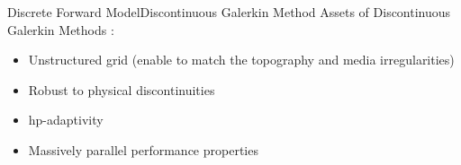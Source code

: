 \begin{frame}{Discrete Forward Model}{Discontinuous Galerkin Method}
  Assets of Discontinuous Galerkin Methods : \\

  \begin{itemize}
  \item Unstructured grid (enable to match the topography and media irregularities)
  \item Robust to physical discontinuities
  \item hp-adaptivity
  \item Massively parallel performance properties
  \end{itemize}

  \begin{figure}[H]
    \centering
    \subfigure[h-adaptivity]{
      
}
    \hspace{1cm}
\end{figure}
\end{frame}
